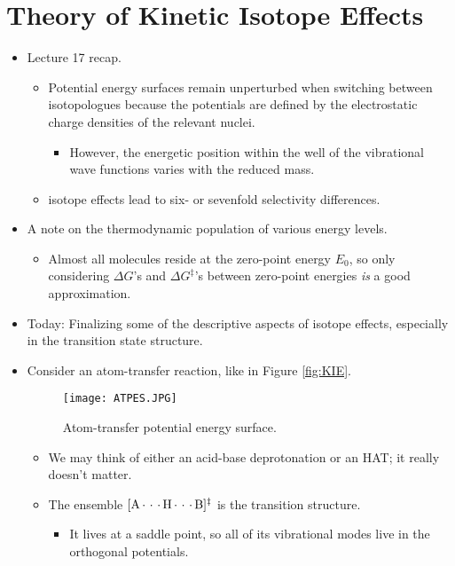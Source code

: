 \documentclass[../notes.tex]{subfiles}
\begin{document}
\section{Theory of Kinetic Isotope Effects}
\begin{itemize}
    \item {}Lecture 17 recap.
    \begin{itemize}
        \item Potential energy surfaces remain unperturbed when switching between isotopologues because the potentials are defined by the electrostatic charge densities of the relevant nuclei.
        \begin{itemize}
            \item However, the energetic position within the well of the vibrational wave functions varies with the reduced mass.
        \end{itemize}
        \item {} isotope effects lead to six- or sevenfold selectivity differences.
    \end{itemize}
    \item A note on the thermodynamic population of various energy levels.
    \begin{itemize}
        \item Almost all molecules reside at the zero-point energy $E_0$, so only considering $\Delta G$'s and $\Delta G^\ddagger$'s between zero-point energies \emph{is} a good approximation.
    \end{itemize}
    \item Today: Finalizing some of the descriptive aspects of isotope effects, especially in the transition state structure.
    \item Consider an atom-transfer reaction, like in Figure \ref{fig:KIE}.
    \begin{figure}[h!]
        \centering
        \texttt{[image: ATPES.JPG]}
        \caption{Atom-transfer potential energy surface.}
        \label{fig:ATPES}
    \end{figure}
    \begin{itemize}
        \item We may think of either an acid-base deprotonation or an HAT; it really doesn't matter.
        \item The ensemble $[\ce{A***H***B}]^\ddagger$ is the transition structure.
        \begin{itemize}
            \item It lives at a saddle point, so all of its vibrational modes live in the orthogonal potentials.

\end{itemize}
\end{itemize}
\end{itemize}
\end{document}
